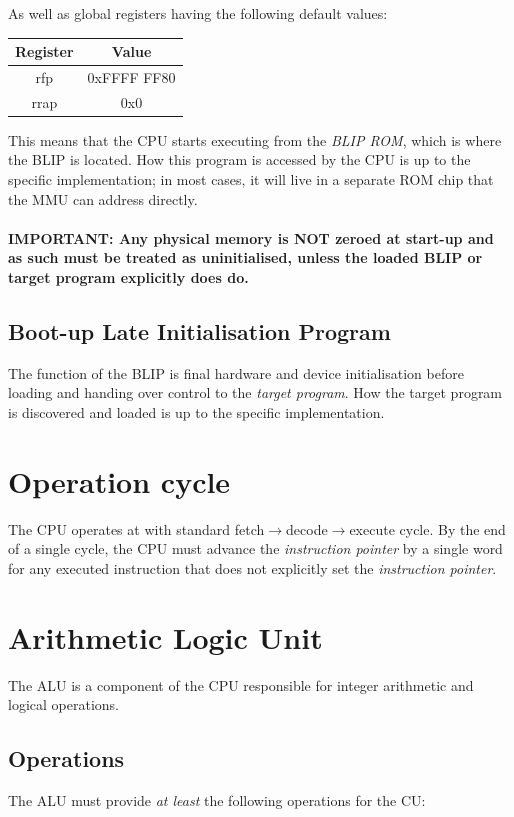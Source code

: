 \documentclass[a4paper,10pt]{article}
\begin{document}
As well as global registers having the following default values:

\begin{table}[H]
	\centering
	{
		\begin{tabular}{|c|c|}
\hline
Register & Value \\
\hline
rfp & 0xFFFF FF80 \\
\hline
rrap & 0x0 \\
\hline
		\end{tabular}
	}
\end{table}

This means that the CPU starts executing from the \emph{BLIP ROM}, which is where the \gls{BLIP} is located. How this program is accessed by the CPU is up to the specific implementation; in most cases, it will live in a separate ROM chip that the MMU can address directly.\\
\\
\textbf{IMPORTANT: Any physical memory is NOT zeroed at start-up and as such must be treated as uninitialised, unless the loaded BLIP or target program explicitly does do.}

\subsection{Boot-up Late Initialisation Program}
The function of the \acrshort{BLIP} is final hardware and device initialisation before loading and handing over control to the \emph{target program}. How the target program is discovered and loaded is up to the specific implementation.

\section{Operation cycle}
The CPU operates at with standard fetch$\to$decode$\to$execute cycle. By the end of a single cycle, the CPU must advance the \emph{instruction pointer} by a single word for any executed instruction that does not explicitly set the \emph{instruction pointer}.

\section{Arithmetic Logic Unit}
The ALU is a component of the CPU responsible for integer arithmetic and logical operations.

\subsection{Operations} \label{alu:op}
The ALU must provide \emph{at least} the following operations for the \gls{CU}:
\end{document}
